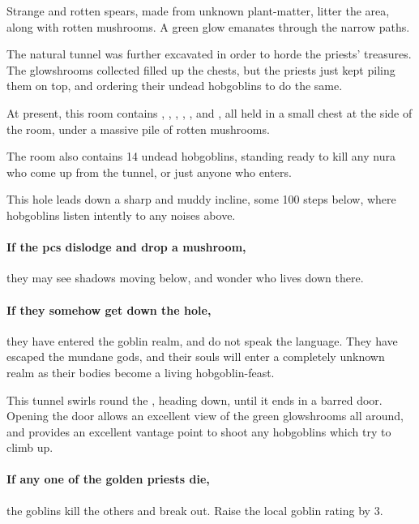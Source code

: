 Strange and rotten spears, made from unknown plant-matter, litter the area, along with rotten mushrooms.
A green glow emanates through the narrow paths.


\begin{exampletext}
  The natural tunnel was further excavated in order to horde the priests' treasures.
  The glowshrooms collected filled up the chests, but the priests just kept piling them on top, and ordering their undead hobgoblins to do the same.
\end{exampletext}

At present, this room contains \lootMedium, \lootJewellery, \lootJewellery, \lootJewellery, \lootJewellery, and \lootBig, all held in a small chest at the side of the room, under a massive pile of rotten mushrooms.

The room also contains 14 undead hobgoblins, standing ready to kill any nura who come up from the tunnel, or just anyone who enters.



This hole leads down a sharp and muddy incline, some 100 steps below, where hobgoblins listen intently to any noises above.

\paragraph{If the \glspl{pc} dislodge and drop a mushroom,}
they may see shadows moving below, and wonder who lives down there.

\paragraph{If they somehow get down the hole,}
they have entered the goblin realm, and do not speak the language.
They have escaped the mundane gods, and their souls will enter a completely unknown realm as their bodies become a living hobgoblin-feast.


\begin{exampletext}
  This tunnel swirls round the , heading down, until it ends in a barred door.
  Opening the door allows an excellent view of the green glowshrooms all around, and provides an excellent vantage point to shoot any hobgoblins which try to climb up.
\end{exampletext}

\paragraph{If any one of the golden priests die,}
the goblins kill the others and break out.
Raise the local goblin rating by 3.%
